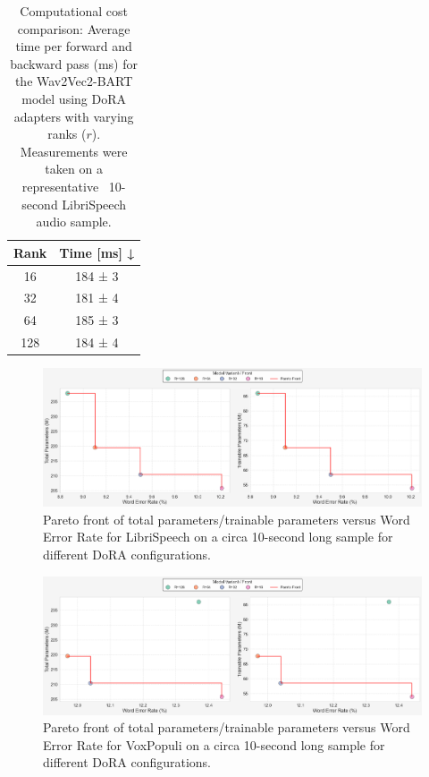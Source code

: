 \begin{table}[h]
    \centering
    \begin{tabular}{@{}cc@{}}
    \toprule
        Rank &  Time [ms] ↓   \\
         \midrule
         16 & 184 ± 3 \\
         32 & 181 ± 4 \\
         64 & 185 ± 3 \\
         128 & 184 ± 4 \\
    \bottomrule
    \end{tabular}
    \caption{Computational cost comparison: Average time per forward and backward pass (ms) for the Wav2Vec2-BART model using DoRA adapters with varying ranks (\( r \)). Measurements were taken on a representative ~10-second LibriSpeech audio sample.}
    \label{tab:doras_time}
\end{table}

\begin{figure}[h!]
    \centering
    \includegraphics[width=1\textwidth]{obrazky-figures/plots/libri_dora.png} 
    \caption{Pareto front of total parameters/trainable parameters versus Word Error Rate for LibriSpeech on a circa 10-second long sample for different DoRA configurations.}
    \label{fig:pareto-front-librispeech-dora}
\end{figure}

\begin{figure}[h!]
    \centering
    \includegraphics[width=1\textwidth]{obrazky-figures/plots/vox_dora.png} 
    \caption{Pareto front of total parameters/trainable parameters versus Word Error Rate for VoxPopuli on a circa 10-second long sample for different DoRA configurations.}
    \label{fig:pareto-front-voxpopuli-dora}
\end{figure}

